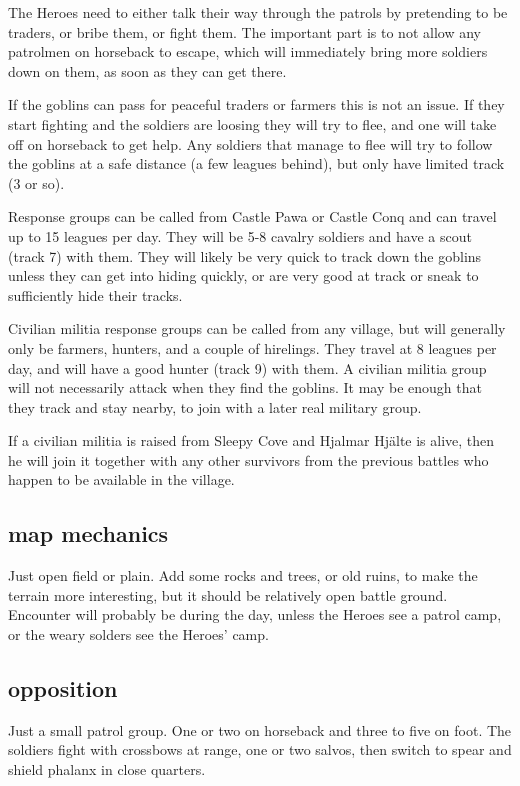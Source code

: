 \noindent The Heroes need to either talk their way through the patrols by pretending to be traders, or bribe them, or fight them. The important part is to not allow any patrolmen on horseback to escape, which will immediately bring more soldiers down on them, as soon as they can get there.

If the goblins can pass for peaceful traders or farmers this is not an issue. If they start fighting and the soldiers are loosing they will try to flee, and one will take off on horseback to get help. Any soldiers that manage to flee will try to follow the goblins at a safe distance (a few leagues behind), but only have limited track (3 or so).

Response groups can be called from Castle Pawa or Castle Conq and can travel up to 15 leagues per day. They will be 5-8 cavalry soldiers and have a scout (track 7) with them. They will likely be very quick to track down the goblins unless they can get into hiding quickly, or are very good at track or sneak to sufficiently hide their tracks.

Civilian militia response groups can be called from any village, but will generally only be farmers, hunters, and a couple of hirelings. They travel at 8 leagues per day, and will have a good hunter (track 9) with them. A civilian militia group will not necessarily attack when they find the goblins. It may be enough that they track and stay nearby, to join with a later real military group.

If a civilian militia is raised from Sleepy Cove and Hjalmar Hjälte is alive, then he will join it together with any other survivors from the previous battles who happen to be available in the village.


\subsection*{map mechanics}

Just open field or plain. Add some rocks and trees, or old ruins, to make the terrain more interesting, but it should be relatively open battle ground.
Encounter will probably be during the day, unless the Heroes see a patrol camp, or the weary solders see the Heroes' camp.


\subsection*{opposition}

Just a small patrol group. One or two on horseback and three to five on foot. The soldiers fight with crossbows at range, one or two salvos, then switch to spear and shield phalanx in close quarters.

